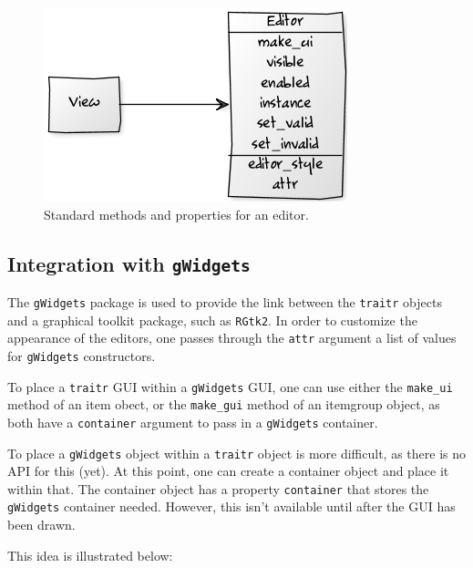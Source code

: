 \documentclass{article}
\newcommand{\code}[1]{\texttt{#1}} %
\newcommand{\args}[1]{\code{#1}} %
\newcommand{\generic}[1]{\code{#1}} %
\newcommand{\meth}[1]{\generic{#1}}     %
\newcommand{\pkg}[1]{\texttt{#1}}
\begin{document}
\begin{figure}
  \centering
  \includegraphics[]{uml-editor}
  \caption{Standard methods and properties for an editor.}
  \label{fig:uml-editor}
\end{figure}


\subsection{Integration with \pkg{gWidgets}}
\label{sec:integr-with-pkggw}

The \pkg{gWidgets} package is used to provide the link between the
\pkg{traitr} objects and a graphical toolkit package, such as
\pkg{RGtk2}. In order to customize the appearance of the editors, one
passes through the \args{attr} argument a list of values for
\pkg{gWidgets} constructors. 

To place a \pkg{traitr} GUI within a \pkg{gWidgets} GUI, one can use
either the \meth{make\_ui} method of an item obect, or the
\meth{make\_gui} method of an itemgroup object, as both have a
\code{container} argument to pass in a \code{gWidgets} container.

To place a \code{gWidgets} object within  a \code{traitr} object is
more difficult, as there is no API for this (yet). At this point, one
can create a container object and place it within that. The container
object has a property \code{container} that stores the \pkg{gWidgets}
container needed. However, this isn't available until after the GUI
has been drawn.

This idea is illustrated below:
\begin{Schunk}
\end{Schunk}
\end{document}
